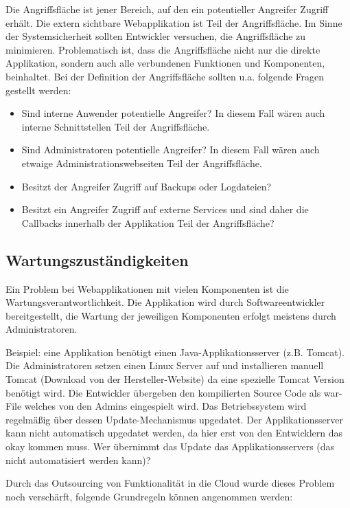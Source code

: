 Die Angriffsfläche ist jener Bereich, auf den ein potentieller Angreifer Zugriff erhält. Die extern sichtbare Webapplikation ist Teil der Angriffsfläche. Im Sinne der Systemsicherheit sollten Entwickler versuchen, die Angriffsfläche zu minimieren. Problematisch ist, dass die Angriffsfläche nicht nur die direkte Applikation, sondern auch alle verbundenen Funktionen und Komponenten, beinhaltet. Bei der Definition der Angriffsfläche sollten u.a. folgende Fragen gestellt werden: 

\begin{itemize}
	\item Sind interne Anwender potentielle Angreifer? In diesem Fall wären auch interne Schnittstellen Teil der Angriffsfläche.
	\item Sind Administratoren potentielle Angreifer? In diesem Fall wären auch etwaige Administrationswebseiten Teil der Angriffsfläche.
	\item Besitzt der Angreifer Zugriff auf Backups oder Logdateien?
	\item Besitzt ein Angreifer Zugriff auf externe Services und sind daher die Callbacks innerhalb der Applikation Teil der Angriffsfläche?
\end{itemize}

\subsection{Wartungszuständigkeiten}

Ein Problem bei Webapplikationen mit vielen Komponenten ist die Wartungsverantwortlichkeit. Die Applikation wird durch Softwareentwickler bereitgestellt, die Wartung der jeweiligen Komponenten erfolgt meistens durch Administratoren.

Beispiel: eine Applikation benötigt einen Java-Applikationsserver (z.B. Tomcat). Die Administratoren setzen einen Linux Server auf und installieren manuell Tomcat (Download von der Hersteller-Website) da eine spezielle Tomcat Version benötigt wird. Die Entwickler übergeben den kompilierten Source Code als war-File welches von den Admins eingespielt wird. Das Betriebssystem wird regelmäßig über dessen Update-Mechanismus upgedatet. Der Applikationsserver kann nicht automatisch upgedatet werden, da hier erst von den Entwicklern das okay kommen muss. Wer übernimmt das Update das Applikationsservers (das nicht automatisiert werden kann)?

Durch das Outsourcing von Funktionalität in die Cloud wurde dieses Problem noch verschärft, folgende Grundregeln können angenommen werden:

